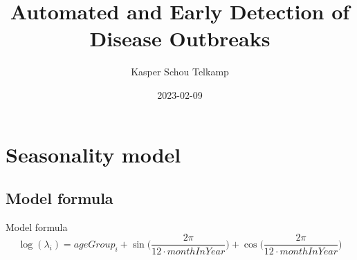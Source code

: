 \documentclass[aspectratio=169]{beamer}
\title[Automated and Early Detection of Disease Outbreaks]{Automated and
Early Detection of Disease Outbreaks}
\author{Kasper Schou Telkamp}
\institute{Section for Dynamical Systems}
\date{2023-02-09}
\begin{document}
\frame{
	\maketitle
}


\hypertarget{seasonality-model}{%
\section{Seasonality model}\label{seasonality-model}}

\hypertarget{model-formula}{%
\subsection{Model formula}\label{model-formula}}

\begin{frame}{Model formula}
\begin{equation}
  \log(\lambda_i) = ageGroup_i + \sin\Big(\frac{2\pi}{12 \cdot monthInYear}\Big) + \cos\Big(\frac{2\pi}{12\cdot monthInYear}\Big)
\end{equation}
\end{frame}
\end{document}
